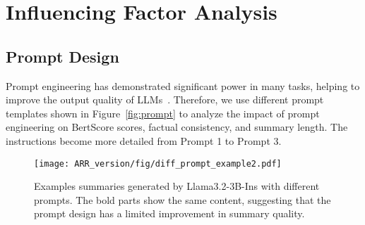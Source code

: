 
\section{Influencing Factor Analysis}
\label{sec:factor}


\subsection{Prompt Design}
Prompt engineering has demonstrated significant power in many tasks, helping to improve the output quality of LLMs~\cite{zhao2021calibrate,surveypromptengineering}. Therefore, we use different prompt templates shown in Figure~\ref{fig:prompt} to analyze the impact of prompt engineering on BertScore scores, factual consistency, and summary length. The instructions become more detailed from Prompt 1 to Prompt 3.



\begin{figure}
    \centering
    \texttt{[image: ARR\_version/fig/diff\_prompt\_example2.pdf]}
    \caption{Examples summaries generated by Llama3.2-3B-Ins with different prompts. The bold parts show the same content, suggesting that the prompt design has a limited improvement in summary quality.}
    \label{fig:diff_prompt_example}
\end{figure}




